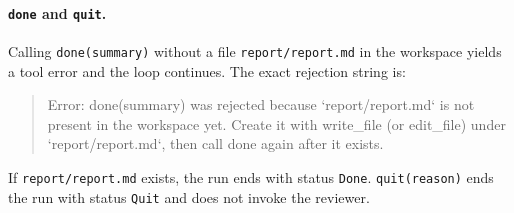\begin{AgentDetails}
\paragraph{\texttt{done} and \texttt{quit}.}
Calling \texttt{done(summary)} without a file \texttt{report/report.md} in the workspace yields a tool error and the loop continues. The exact rejection string is:
\begin{quote}\small\ttfamily
Error: done(summary) was rejected because `report/report.md` is not present in the workspace yet. Create it with write\_file (or edit\_file) under `report/report.md`, then call done again after it exists.
\end{quote}
If \texttt{report/report.md} exists, the run ends with status \texttt{Done}. \texttt{quit(reason)} ends the run with status \texttt{Quit} and does not invoke the reviewer.

\end{AgentDetails}